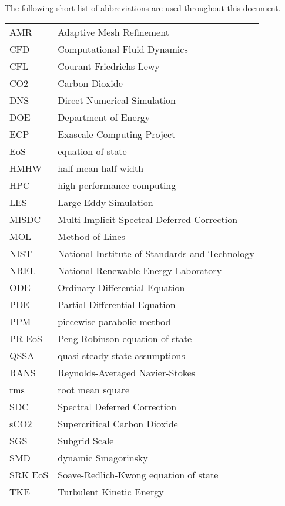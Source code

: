 \documentclass[11pt,expanded,copyright]{fsuthesis}
\begin{document}
\begin{listofabbrevs}
The following short list of abbreviations are used throughout this document. 
\begin{center}
\begin{tabular}{ll}
AMR& Adaptive Mesh Refinement \\
CFD& Computational Fluid Dynamics \\
CFL& Courant-Friedrichs-Lewy \\
CO2& Carbon Dioxide \\
DNS& Direct Numerical Simulation \\
DOE& Department of Energy \\
ECP& Exascale Computing Project \\
EoS& equation of state \\
HMHW& half-mean half-width \\
HPC& high-performance computing \\
LES& Large Eddy Simulation \\
MISDC& Multi-Implicit Spectral Deferred Correction \\
MOL& Method of Lines \\
NIST& National Institute of Standards and Technology \\
NREL& National Renewable Energy Laboratory \\
ODE& Ordinary Differential Equation \\
PDE& Partial Differential Equation \\
PPM& piecewise parabolic method \\
PR EoS& Peng-Robinson equation of state \\
QSSA& quasi-steady state assumptions \\
RANS& Reynolds-Averaged Navier-Stokes \\
rms& root mean square \\
SDC& Spectral Deferred Correction \\
sCO2& Supercritical Carbon Dioxide \\
SGS& Subgrid Scale \\
SMD& dynamic Smagorinsky \\
SRK EoS& Soave-Redlich-Kwong equation of state \\
TKE& Turbulent Kinetic Energy \\



\end{tabular}
\end{center}
\end{listofabbrevs}
\end{document}
